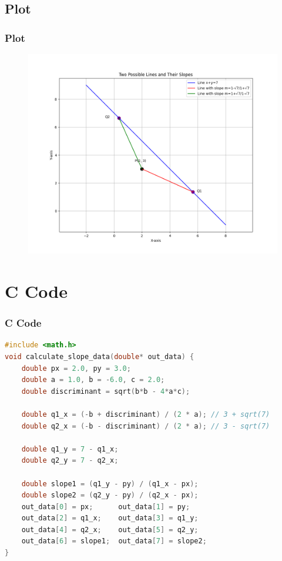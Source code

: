 \documentclass{beamer}
\theoremstyle{remark}
\numberwithin{equation}{section}
\begin{document}
\subsection{Plot}
\begin{frame}[fragile]
\frametitle{Plot}

\begin{figure}[h!]
   \centering
   \includegraphics[width=0.7\columnwidth]{figs/fig1.png}
	\caption{}
   \label{}
\end{figure}
\end{frame}

\section{C Code}
\begin{frame}[fragile]
\frametitle{C Code}
\begin{lstlisting}[language=C]
#include <math.h>
void calculate_slope_data(double* out_data) {
    double px = 2.0, py = 3.0;
    double a = 1.0, b = -6.0, c = 2.0;
    double discriminant = sqrt(b*b - 4*a*c);
    
    double q1_x = (-b + discriminant) / (2 * a); // 3 + sqrt(7)
    double q2_x = (-b - discriminant) / (2 * a); // 3 - sqrt(7)

    double q1_y = 7 - q1_x;  
    double q2_y = 7 - q2_x;  
    
    double slope1 = (q1_y - py) / (q1_x - px);
    double slope2 = (q2_y - py) / (q2_x - px);
    out_data[0] = px;      out_data[1] = py;
    out_data[2] = q1_x;    out_data[3] = q1_y;
    out_data[4] = q2_x;    out_data[5] = q2_y;
    out_data[6] = slope1;  out_data[7] = slope2;
}
    \end{lstlisting}
\end{frame}
\end{document}
